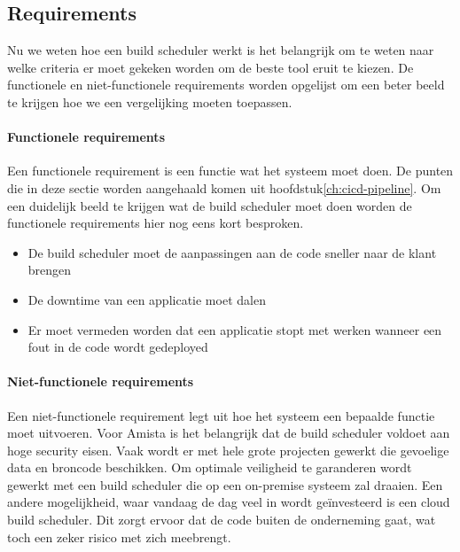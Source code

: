         
        
        \subsection{Requirements}
        \label{subsec:requirements}
        Nu we weten hoe een build scheduler werkt is het belangrijk om te weten naar welke criteria er moet gekeken worden om de beste tool eruit te kiezen. De functionele en niet-functionele requirements worden opgelijst om een beter beeld te krijgen hoe we een vergelijking moeten toepassen.

            \paragraph{Functionele requirements}
            Een functionele requirement is een functie wat het systeem moet doen.
            De punten die in deze sectie worden aangehaald komen uit hoofdstuk\ref{ch:cicd-pipeline}. Om een duidelijk beeld te krijgen wat de build scheduler moet doen worden de functionele requirements hier nog eens kort besproken.
            \begin{itemize}
                \item De build scheduler moet de aanpassingen aan de code sneller naar de klant brengen
                \item De downtime van een applicatie moet dalen
                \item Er moet vermeden worden dat een applicatie stopt met werken wanneer een fout in de code wordt gedeployed
            \end{itemize}
            
            \paragraph{Niet-functionele requirements}
            Een niet-functionele requirement legt uit hoe het systeem een bepaalde functie moet uitvoeren. Voor Amista is het belangrijk dat de build scheduler voldoet aan hoge security eisen. Vaak wordt er met hele grote projecten gewerkt die gevoelige data en broncode beschikken. Om optimale veiligheid te garanderen wordt gewerkt met een build scheduler die op een on-premise systeem zal draaien. Een andere mogelijkheid, waar vandaag de dag veel in wordt geïnvesteerd is een cloud build scheduler. Dit zorgt ervoor dat de code buiten de onderneming gaat, wat toch een zeker risico met zich meebrengt.

